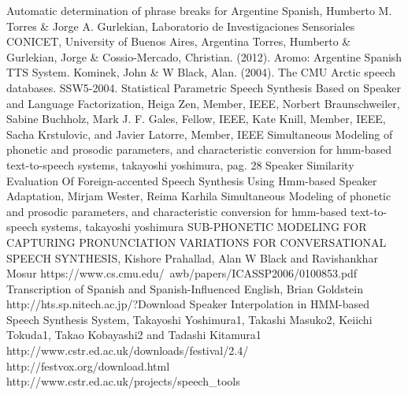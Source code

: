 \begin{thebibliography}{9}

 Automatic determination of phrase breaks for Argentine Spanish, Humberto M. Torres \& Jorge A. Gurlekian, Laboratorio de Investigaciones Sensoriales CONICET, University of Buenos Aires, Argentina
 Torres, Humberto \& Gurlekian, Jorge \& Cossio-Mercado, Christian. (2012). Aromo: Argentine Spanish TTS System.
 Kominek, John \& W Black, Alan. (2004). The CMU Arctic speech databases. SSW5-2004.
 Statistical Parametric Speech Synthesis Based on Speaker and Language Factorization, Heiga Zen, Member, IEEE, Norbert Braunschweiler, Sabine Buchholz, Mark J. F. Gales, Fellow, IEEE, Kate Knill, Member, IEEE, Sacha Krstulovic, and Javier Latorre, Member, IEEE
 Simultaneous Modeling of phonetic and prosodic parameters, and characteristic conversion for hmm-based text-to-speech systems, takayoshi yoshimura, pag. 28
 Speaker Similarity Evaluation Of Foreign-accented Speech Synthesis Using Hmm-based Speaker Adaptation, Mirjam Wester, Reima Karhila
 Simultaneous Modeling of phonetic and prosodic parameters, and characteristic conversion for hmm-based text-to-speech systems, takayoshi yoshimura
 SUB-PHONETIC MODELING FOR CAPTURING PRONUNCIATION VARIATIONS FOR CONVERSATIONAL SPEECH SYNTHESIS, Kishore Prahallad, Alan W Black and Ravishankhar Mosur https://www.cs.cmu.edu/~awb/papers/ICASSP2006/0100853.pdf
 Transcription of Spanish and Spanish-Influenced English, Brian Goldstein
 http://hts.sp.nitech.ac.jp/?Download
 Speaker Interpolation in HMM-based Speech Synthesis System, Takayoshi Yoshimura1, Takashi Masuko2, Keiichi Tokuda1, Takao Kobayashi2 and Tadashi Kitamura1
 http://www.cstr.ed.ac.uk/downloads/festival/2.4/
 http://festvox.org/download.html
 http://www.cstr.ed.ac.uk/projects/speech\_tools
\end{thebibliography}